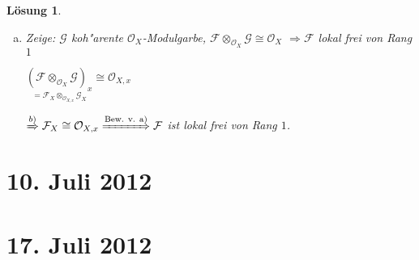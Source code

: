 \documentclass[paper = A4, fontsize=12pt, numbers=noendperiod, chapterprefix=true]{scrbook}
\theoremstyle{break}
\newtheorem{Loes}{L\"osung}
\theoremstyle{nonumberbreak}
\theoremstyle{nonumberplain}
\newcommand{\quot}[1]{\textrm{\glqq}{#1}\textrm{\grqq}}
\newcommand{\calF}{\mathcal{F}}
\newcommand{\calG}{\mathcal{G}}
\newcommand{\calO}{\mathcal{O}}
\newcommand{\FakRaum}[2]{
	\raisebox{0.7ex}{\ensuremath{#1}}
	\ensuremath{\mkern-3mu}\big/\ensuremath{\mkern-3mu}
	\raisebox{-0.6ex}{\ensuremath{#2}}}
\renewcommand{\OE}{O\!\!E~}
\begin{document}
\begin{Loes}
\begin{enumerate}[a)]
	$(ab \otimes m) \otimes (1 \otimes n) = (a \otimes m) \otimes (b \otimes n) \Rightarrow \varphi$ surjektiv $\Rightarrow \dim_k (k \otimes_A M) \otimes_k (k \otimes_A N) \le 1$
	
	\emph{Annahme:} \quot{$=0$}
	
	$\Rightarrow k \otimes_A M = 0$ oder $k \otimes_A N = 0$
	
	\OE $k \otimes_A M = 0$ \textcolor{gray}{($k \otimes_A M = \FakRaum{A}{m} \otimes_A M = \FakRaum{M}{mM}$)}
	
	$\Rightarrow M = mM + 0 \xRightarrow{\text{Nakayama}} M = 0$\\
	$\Rightarrow A = M \otimes_A N = 0 \lightning$
	
	$\Rightarrow \dim_k (k \otimes_A M) = 0$
	
	$\FakRaum{M}{mM} \cong \FakRaum{A}{m} \xRightarrow{\text{Nakayama}} M \cong A$, $N \cong A$ analog
	
	$M = mM + (X)$ $A$-Modul
\item
	\emph{Zeige:} $\calG$ koh"arente $\calO_X$-Modulgarbe, $\calF \otimes_{\calO_X} \calG \cong \calO_X$ $\Rightarrow \calF$ lokal frei von Rang $1$
	
	$\underset{=\calF_X \otimes_{\calO_{X,x}} \calG_X}{(\calF \otimes_{\calO_X} \calG)_x} \cong \calO_{X,x}$
	
	$\xRightarrow{b)} \calF_X \cong \calO_{X,x} \xRightarrow{\text{Bew. v. a)}} \calF$ ist lokal frei von Rang $1$.
\end{enumerate}\end{Loes}


\newpage
\section{10. Juli 2012}
\setcounter{Aufg}{0}
\setcounter{Loes}{0}

\newpage
\section{17. Juli 2012}
\setcounter{Aufg}{0}
\setcounter{Loes}{0}

\end{document}
